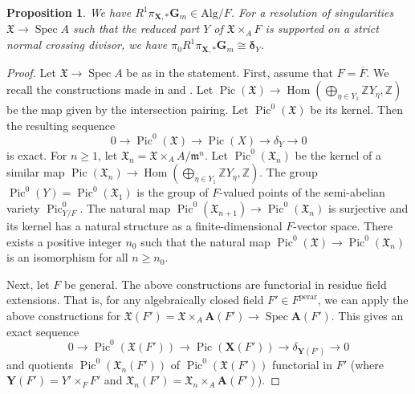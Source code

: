 \documentclass{amsart}
\newtheorem{Prop}[Thm]{Proposition}
\theoremstyle{remark}
\numberwithin{equation}{section}
\newcommand{\closure}[1]{\overline{#1}}
\newcommand{\Z}{\mathbb{Z}}
\newcommand{\Gm}{\mathbf{G}_{m}}
\newcommand{\perar}{\mathrm{perar}}
\newcommand{\Alg}{\mathrm{Alg}}
\newcommand{\alg}[1]{\mathbf{#1}}
\newcommand{\ideal}[1]{\mathfrak{#1}}
\newcommand{\varalg}[1]{\bm{#1}}
\DeclareMathOperator{\Hom}{Hom}
\DeclareMathOperator{\Spec}{Spec}
\DeclareMathOperator{\Pic}{Pic}
\begin{document}
\begin{Prop} \label{0044}
	We have $R^{1} \pi_{\alg{X}, \ast} \Gm \in \Alg / F$.
	For a resolution of singularities $\mathfrak{X} \to \Spec A$
	such that the reduced part $Y$ of $\mathfrak{X} \times_{A} F$ is supported on a strict normal crossing divisor,
	we have $\pi_{0} R^{1} \pi_{\alg{X}, \ast} \Gm \cong \varalg{\delta}_{Y}$.
\end{Prop}

\begin{proof}
	Let $\mathfrak{X} \to \Spec A$ be as in the statement.
	First, assume that $F = \closure{F}$.
	We recall the constructions made in
	\cite[Section 14]{Lip69} and \cite[Proof of Lemma (7.2)]{Sai86}.
	Let $\Pic(\mathfrak{X}) \to \Hom(\bigoplus_{\eta \in Y_{1}} \Z Y_{\eta}, \Z)$
	be the map given by the intersection pairing.
	Let $\Pic^{0}(\mathfrak{X})$ be its kernel.
	Then the resulting sequence
		\[
				0
			\to
				\Pic^{0}(\mathfrak{X})
			\to
				\Pic(X)
			\to
				\delta_{Y}
			\to
				0
		\]
	is exact.
	For $n \ge 1$, let $\mathfrak{X}_{n} = \mathfrak{X} \times_{A} A / \ideal{m}^{n}$.
	Let $\Pic^{0}(\mathfrak{X}_{n})$ be the kernel of a similar map
	$\Pic(\mathfrak{X}_{n}) \to \Hom(\bigoplus_{\eta \in Y_{1}} \Z Y_{\eta}, \Z)$.
	The group $\Pic^{0}(Y) = \Pic^{0}(\mathfrak{X}_{1})$ is
	the group of $F$-valued points of the semi-abelian variety $\Pic^{0}_{Y / F}$.
	The natural map $\Pic^{0}(\mathfrak{X}_{n + 1}) \to \Pic^{0}(\mathfrak{X}_{n})$ is surjective
	and its kernel has a natural structure as a finite-dimensional $F$-vector space.
	There exists a positive integer $n_{0}$ such that
	the natural map $\Pic^{0}(\mathfrak{X}) \to \Pic^{0}(\mathfrak{X}_{n})$
	is an isomorphism for all $n \ge n_{0}$.
	
	Next, let $F$ be general.
	The above constructions are functorial in residue field extensions.
	That is, for any algebraically closed field $F' \in F^{\perar}$,
	we can apply the above constructions for
	$\varalg{\mathfrak{X}}(F') = \mathfrak{X} \times_{A} \alg{A}(F') \to \Spec \alg{A}(F')$.
	This gives an exact sequence
		\[
				0
			\to
				\Pic^{0}(\varalg{\mathfrak{X}}(F'))
			\to
				\Pic(\alg{X}(F'))
			\to
				\delta_{\alg{Y}(F')}
			\to
				0
		\]
	and quotients $\Pic^{0}(\varalg{\mathfrak{X}}_{n}(F'))$ of $\Pic^{0}(\varalg{\mathfrak{X}}(F'))$
	functorial in $F'$
	(where $\alg{Y}(F') = Y' \times_{F} F'$
	and $\varalg{\mathfrak{X}}_{n}(F') = \mathfrak{X}_{n} \times_{A} \alg{A}(F')$).
	

\end{proof}
\end{document}

